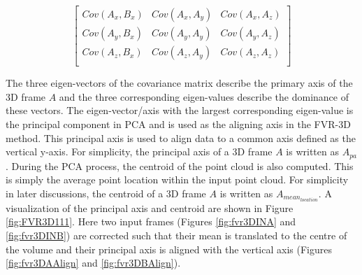 \begin{equation} \label{eqn:CovarMatrix}
\left[
\begin{array}{ccc}
Cov(A_x, B_x) & Cov(A_x, A_y) & Cov(A_x, A_z) \\
Cov(A_y, B_x) & Cov(A_y, A_y) & Cov(A_y, A_z) \\
Cov(A_z, B_x) & Cov(A_z, A_y) & Cov(A_z, A_z) \\
\end{array}
\right]
\end{equation}

The three eigen-vectors of the covariance matrix describe the primary axis of the 3D frame $A$ and the three corresponding eigen-values describe the dominance of these vectors. The eigen-vector/axis with the largest corresponding eigen-value is the principal component in PCA and is used as the aligning axis in the FVR-3D method. This principal axis is used to align data to a common axis defined as the vertical y-axis. For simplicity, the principal axis of a 3D frame $A$ is written as $A_{pa}$. During the PCA process, the centroid of the point cloud is also computed. This is simply the average point location within the input point cloud. For simplicity in later discussions, the centroid of a 3D frame $A$ is written as $A_{mean_{location}}$. A visualization of the principal axis and centroid are shown in Figure \ref{fig:FVR3D111}. Here two input frames (Figures \ref{fig:fvr3DINA} and \ref{fig:fvr3DINB}) are corrected such that their mean is translated to the centre of the volume and their principal axis is aligned with the vertical axis (Figures \ref{fig:fvr3DAAlign} and \ref{fig:fvr3DBAlign}). \\

